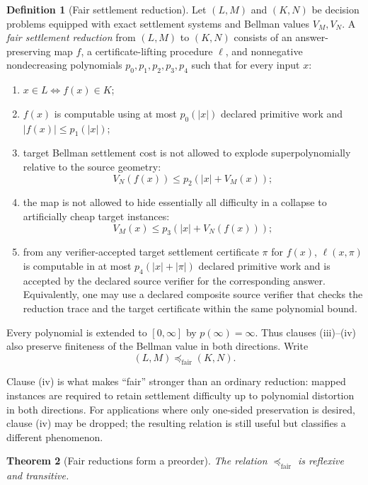 \documentclass[11pt]{article}
\newtheorem{theorem}{Theorem}[section]
\theoremstyle{definition}
\newtheorem{definition}[theorem]{Definition}
\newcommand{\preFair}{\preceq_{\mathrm{fair}}}
\begin{document}
\begin{definition}[Fair settlement reduction]\label{def:fair}
Let $(L,M)$ and $(K,N)$ be decision problems equipped with exact settlement systems and Bellman values $V_M,V_N$. A \emph{fair settlement reduction} from $(L,M)$ to $(K,N)$ consists of an answer-preserving map $f$, a certificate-lifting procedure $\ell$, and nonnegative nondecreasing polynomials $p_0,p_1,p_2,p_3,p_4$ such that for every input $x$:
\begin{enumerate}[label=(\roman*)]
    \item $x\in L\Longleftrightarrow f(x)\in K$;
    \item $f(x)$ is computable using at most $p_0(|x|)$ declared primitive work and $|f(x)|\le p_1(|x|)$;
    \item target Bellman settlement cost is not allowed to explode superpolynomially relative to the source geometry:
    \[
    V_N(f(x))\le p_2(|x|+V_M(x));
    \]
    \item the map is not allowed to hide essentially all difficulty in a collapse to artificially cheap target instances:
    \[
    V_M(x)\le p_3(|x|+V_N(f(x)));
    \]
    \item from any verifier-accepted target settlement certificate $\pi$ for $f(x)$, $\ell(x,\pi)$ is computable in at most $p_4(|x|+|\pi|)$ declared primitive work and is accepted by the declared source verifier for the corresponding answer. Equivalently, one may use a declared composite source verifier that checks the reduction trace and the target certificate within the same polynomial bound.
\end{enumerate}
Every polynomial is extended to $[0,\infty]$ by $p(\infty)=\infty$. Thus clauses (iii)--(iv) also preserve finiteness of the Bellman value in both directions.
Write
\[
(L,M)\preFair(K,N).
\]
\end{definition}

Clause (iv) is what makes ``fair'' stronger than an ordinary reduction: mapped instances are required to retain settlement difficulty up to polynomial distortion in both directions. For applications where only one-sided preservation is desired, clause (iv) may be dropped; the resulting relation is still useful but classifies a different phenomenon.

\begin{theorem}[Fair reductions form a preorder]\label{thm:fair-preorder}
The relation $\preFair$ is reflexive and transitive.
\end{theorem}
\end{document}
